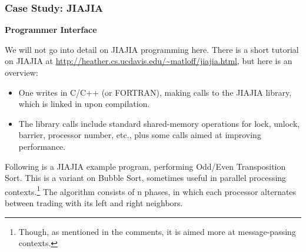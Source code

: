 \subsubsection{Case Study:  JIAJIA}

\textbf{Programmer Interface}

We will not go into detail on JIAJIA programming here.  There is
a short tutorial on JIAJIA at
\url{http://heather.cs.ucdavis.edu/~matloff/jiajia.html}, but
here is an overview:

\begin{itemize}

\item One writes in C/C++ (or FORTRAN), making calls to the
JIAJIA library, which is linked in upon compilation.

\item The library calls include standard shared-memory operations for
lock, unlock, barrier, processor number, etc., plus some calls aimed
at improving performance.

\end{itemize}

Following is a JIAJIA example program, performing Odd/Even Transposition
Sort.  This is a variant on Bubble Sort, sometimes useful in parallel
processing contexts.\footnote{Though, as mentioned in the comments, it
is aimed more at message-passing contexts.}  The algorithm consists of n
phases, in which each processor alternates between trading with its left
and right neighbors.

